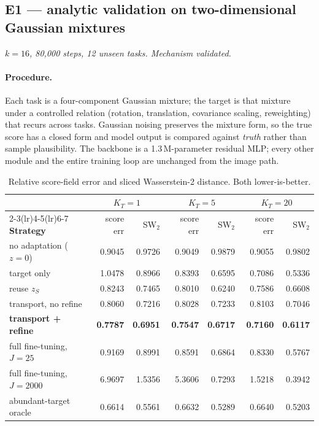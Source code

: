 \documentclass[11pt]{article}
\newcommand{\zS}{z_{S}}
\newcommand{\KT}{K_{T}}
\begin{document}
\subsection{E1 --- analytic validation on two-dimensional Gaussian mixtures}

\textit{$k=16$, 80{,}000 steps, 12 unseen tasks. Mechanism validated.}

\paragraph{Procedure.} Each task is a four-component Gaussian mixture; the target is that mixture
under a controlled relation (rotation, translation, covariance scaling, reweighting) that recurs
across tasks. Gaussian noising preserves the mixture form, so the true score has a closed form and
model output is compared against \emph{truth} rather than sample plausibility. The backbone is a
1.3\,M-parameter residual MLP; every other module and the entire training loop are unchanged from
the image path.

\begin{table}[htbp]
\centering\small
\begin{tabular}{@{}lrrrrrr@{}}
\toprule
& \multicolumn{2}{c}{$\KT=1$} & \multicolumn{2}{c}{$\KT=5$} & \multicolumn{2}{c}{$\KT=20$} \\
\cmidrule(lr){2-3}\cmidrule(lr){4-5}\cmidrule(lr){6-7}
\textbf{Strategy} & score err & SW$_2$ & score err & SW$_2$ & score err & SW$_2$ \\
\midrule
no adaptation ($z=0$)     & 0.9045 & 0.9726 & 0.9049 & 0.9879 & 0.9055 & 0.9802 \\
target only               & 1.0478 & 0.8966 & 0.8393 & 0.6595 & 0.7086 & 0.5336 \\
reuse $\zS$               & 0.8243 & 0.7465 & 0.8010 & 0.6240 & 0.7586 & 0.6608 \\
transport, no refine      & 0.8060 & 0.7216 & 0.8028 & 0.7233 & 0.8103 & 0.7046 \\
\textbf{transport + refine} & \textbf{0.7787} & \textbf{0.6951} & \textbf{0.7547} & \textbf{0.6717} & \textbf{0.7160} & \textbf{0.6117} \\
full fine-tuning, $J=25$  & 0.9169 & 0.8991 & 0.8591 & 0.6864 & 0.8330 & 0.5767 \\
full fine-tuning, $J=2000$& 6.9697 & 1.5356 & 5.3606 & 0.7293 & 1.5218 & 0.3942 \\
abundant-target oracle    & 0.6614 & 0.5561 & 0.6632 & 0.5289 & 0.6640 & 0.5203 \\
\bottomrule
\end{tabular}
\caption{Relative score-field error and sliced Wasserstein-2 distance. Both lower-is-better.}
\end{table}
\end{document}
